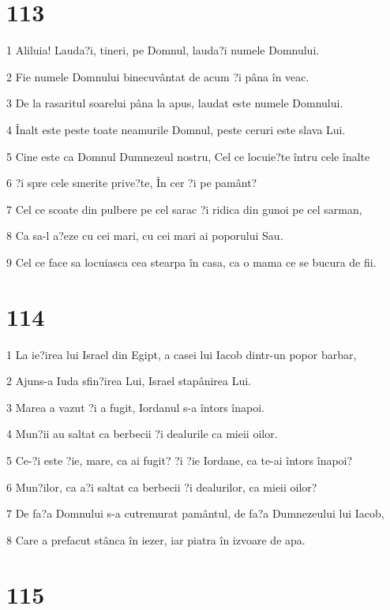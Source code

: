 \chapter{113}

\par 1 Aliluia! Lauda?i, tineri, pe Domnul, lauda?i numele Domnului.
\par 2 Fie numele Domnului binecuvântat de acum ?i pâna în veac.
\par 3 De la rasaritul soarelui pâna la apus, laudat este numele Domnului.
\par 4 Înalt este peste toate neamurile Domnul, peste ceruri este slava Lui.
\par 5 Cine este ca Domnul Dumnezeul nostru, Cel ce locuie?te întru cele înalte
\par 6 ?i spre cele smerite prive?te, În cer ?i pe pamânt?
\par 7 Cel ce scoate din pulbere pe cel sarac ?i ridica din gunoi pe cel sarman,
\par 8 Ca sa-l a?eze cu cei mari, cu cei mari ai poporului Sau.
\par 9 Cel ce face sa locuiasca cea stearpa în casa, ca o mama ce se bucura de fii.

\chapter{114}

\par 1 La ie?irea lui Israel din Egipt, a casei lui Iacob dintr-un popor barbar,
\par 2 Ajuns-a Iuda sfin?irea Lui, Israel stapânirea Lui.
\par 3 Marea a vazut ?i a fugit, Iordanul s-a întors înapoi.
\par 4 Mun?ii au saltat ca berbecii ?i dealurile ca mieii oilor.
\par 5 Ce-?i este ?ie, mare, ca ai fugit? ?i ?ie Iordane, ca te-ai întors înapoi?
\par 6 Mun?ilor, ca a?i saltat ca berbecii ?i dealurilor, ca mieii oilor?
\par 7 De fa?a Domnului s-a cutremurat pamântul, de fa?a Dumnezeului lui Iacob,
\par 8 Care a prefacut stânca în iezer, iar piatra în izvoare de apa.

\chapter{115}

